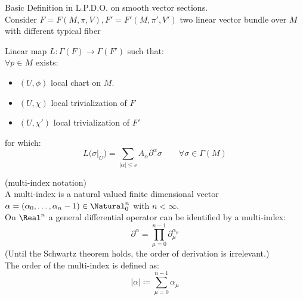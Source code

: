 \documentclass[Main]{subfiles}
\begin{document}
		
		
		Basic Definition in L.P.D.O. on smooth vector sections.
\\
Consider $F=F(M,\pi,V), F'=F'(M,\pi',V')$ two linear vector bundle over $M$ with different typical fiber
	\begin{definition}
		Linear map $L:\Gamma(F)\rightarrow \Gamma(F')$ such that:
		\\
		$\forall p \in M$ exists:
		\begin{itemize}
			\item $(U, \phi)$ local chart on $M$.
			\item $(U, \chi)$ local trivialization of $F$
			\item $(U, \chi')$ local trivialization of $F'$
		\end{itemize}
		for which:
		\begin{displaymath}
			L \big(\sigma \big\vert_U\big) = \sum_{\vert \alpha \vert \leq s} A_\alpha \partial^\alpha \sigma \qquad \forall \sigma \in \Gamma(M)
		\end{displaymath}
	\end{definition}

	\begin{remark}
	(multi-index notation)
	\\
	A multi-index is a natural valued finite dimensional vector $\alpha = ( \alpha_0, \ldots, \alpha_n-1) \in \Natural^n_0$ with $n<\infty$.
	\\
	On $\Real^n$ a general differential operator can be identified by a multi-index:
	\begin{displaymath}
		\partial^\alpha = \prod_{\mu = 0}^{n-1} \partial_\mu ^{\alpha_\mu}
	\end{displaymath}
	(Until the Schwartz theorem holds, the order of derivation is irrelevant.)
	\\
	The order of the multi-index is defined as:
	\begin{displaymath}
		\vert \alpha \vert \coloneqq \sum_{\mu=0}^{n-1} \alpha_\mu
	\end{displaymath}
	\end{remark}
\end{document}
